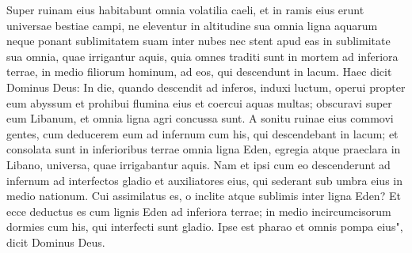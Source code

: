 \begin{biblechapter}
\verse Super ruinam eius habitabunt omnia volatilia caeli, et in ramis eius erunt universae bestiae campi, 
\verse ne eleventur in altitudine sua omnia ligna aquarum neque ponant sublimitatem suam inter nubes nec stent apud eas in sublimitate sua omnia, quae irrigantur aquis, quia omnes traditi sunt in mortem ad inferiora terrae, in medio filiorum hominum, ad eos, qui descendunt in lacum. 
\verse Haec dicit Dominus Deus: In die, quando descendit ad inferos, induxi luctum, operui propter eum abyssum et prohibui flumina eius et coercui aquas multas; obscuravi super eum Libanum, et omnia ligna agri concussa sunt. 
\verse A sonitu ruinae eius commovi gentes, cum deducerem eum ad infernum cum his, qui descendebant in lacum; et consolata sunt in inferioribus terrae omnia ligna Eden, egregia atque praeclara in Libano, universa, quae irrigabantur aquis.  
\verse Nam et ipsi cum eo descenderunt ad infernum ad interfectos gladio et auxiliatores eius, qui sederant sub umbra eius in medio nationum. 
\verse Cui assimilatus es, o inclite atque sublimis inter ligna Eden? Et ecce deductus es cum lignis Eden ad inferiora terrae; in medio incircumcisorum dormies cum his, qui interfecti sunt gladio. Ipse est pharao et omnis pompa eius", dicit Dominus Deus. 
\end{biblechapter}

